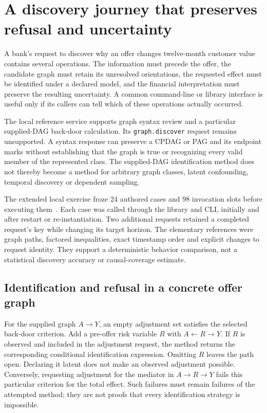 \section{A discovery journey that preserves refusal and uncertainty}
\label{exec13:discovery-journey}

A bank's request to discover why an offer changes twelve-month customer value
contains several operations. The information must precede the offer, the
candidate graph must retain its unresolved orientations, the requested effect
must be identified under a declared model, and the financial interpretation
must preserve the resulting uncertainty. A common command-line or library
interface is useful only if its callers can tell which of these operations
actually occurred.

The local reference service supports graph syntax review and a particular
supplied-DAG back-door calculation. Its \texttt{graph.discover} request remains
unsupported. A syntax response can preserve a CPDAG or PAG and its endpoint
marks without establishing that the graph is true or recognizing every valid
member of the represented class. The supplied-DAG identification method does
not thereby become a method for arbitrary graph classes, latent confounding,
temporal discovery or dependent sampling.

The extended local exercise froze 24 authored cases and 98 invocation slots
before executing them~\citep{exec13_discovery_journey}. Each case was called
through the library and CLI, initially and after restart or re-instantiation.
Two additional requests retained a completed request's key while changing its
target horizon. The elementary references were graph paths, factored
inequalities, exact timestamp order and explicit changes to request identity.
They support a deterministic behavior comparison, not a statistical discovery
accuracy or causal-coverage estimate.

\subsection{Identification and refusal in a concrete offer graph}

For the supplied graph $A\to Y$, an empty adjustment set satisfies the selected
back-door criterion. Add a pre-offer risk variable $R$ with
$A\leftarrow R\to Y$. If $R$ is observed and included in the adjustment
request, the method returns the corresponding conditional identification
expression. Omitting $R$ leaves the path open. Declaring it latent does not
make an observed adjustment possible. Conversely, requesting adjustment for
the mediator in $A\to R\to Y$ fails this particular criterion for the total
effect. Such failures must remain failures of the attempted method; they are
not proofs that every identification strategy is impossible.

